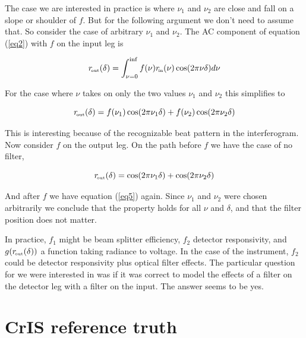 \documentclass[12pt]{article}
\begin{document}
The case we are interested in practice is where $\nu_1$ and $\nu_2$
are close and fall on a slope or shoulder of $f$.  But for the
following argument we don't need to assume that.  So consider the
case of arbitrary $\nu_1$ and $\nu_2$.  The AC component of equation
(\ref{eq2}) with $f$ on the input leg is

\begin{equation}\label{eq4}
  r_{\!\mbox{\tiny out}}(\delta) = \int_{\nu=0}^{\inf}f(\nu)r_{\!\mbox{\tiny in}}(\nu)\cos(2\pi\nu\delta)d\nu
\end{equation}

\noindent
For the case where $\nu$ takes on only the two values $\nu_1$ and
$\nu_2$ this simplifies to

\begin{equation}\label{eq5}
  r_{\!\mbox{\tiny out}}(\delta) = f(\nu_1)\cos(2\pi\nu_1\delta) + 
                  f(\nu_2)\cos(2\pi\nu_2\delta)
\end{equation}

\noindent
This is interesting because of the recognizable beat pattern in 
the interferogram.  Now consider $f$ on the output leg.  On the 
path before $f$ we have the case of no filter,

\begin{equation}\label{eq6}
  r_{\!\mbox{\tiny out}}(\delta) = \cos(2\pi\nu_1\delta) + 
                  \cos(2\pi\nu_2\delta)
\end{equation}

\noindent
And after $f$ we have equation (\ref{eq5}) again.  Since $\nu_1$ and
$\nu_2$ were chosen arbitrarily we conclude that the property holds
for all $\nu$ and $\delta$, and that the filter position does not
matter.

In practice, $f_1$ might be beam splitter efficiency, $f_2$ detector
responsivity, and $g(r_{\!\mbox{\tiny out}}(\delta))$ a function taking radiance to
voltage.  In the case of the {\cris} instrument, $f_2$ could be
detector responsivity plus optical filter effects.  The particular
question for {\cris} we were interested in was if it was correct
to model the effects of a filter on the detector leg with a filter
on the input.  The answer seems to be yes.

\FloatBarrier

\section{CrIS reference truth }
\end{document}
